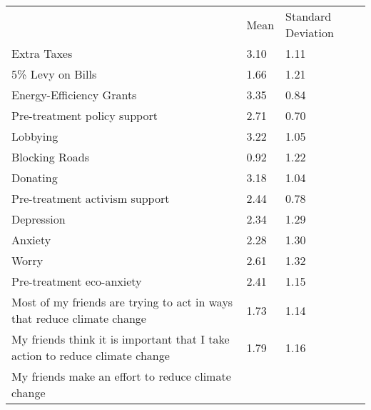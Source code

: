 \documentclass{article}
\begin{document}
\begin{table}[!h]
\centering
\begin{tabular}{lll}
\cline{1-3}
\multicolumn{1}{|l}{} &
  \multicolumn{1}{|l}{Mean} &
  \multicolumn{1}{|l|}{Standard Deviation} \\
\cline{1-3}
\multicolumn{1}{|l}{Extra Taxes} &
  \multicolumn{1}{|l}{3.10} &
  \multicolumn{1}{|l|}{1.11} \\
\cline{1-3}
\multicolumn{1}{|l}{5\% Levy on Bills} &
  \multicolumn{1}{|l}{1.66} &
  \multicolumn{1}{|l|}{1.21} \\
\cline{1-3}
\multicolumn{1}{|l}{Energy-Efficiency Grants} &
  \multicolumn{1}{|l}{3.35} &
  \multicolumn{1}{|l|}{0.84} \\
\cline{1-3}
\multicolumn{1}{|l}{Pre-treatment policy support} &
  \multicolumn{1}{|l}{2.71} &
  \multicolumn{1}{|l|}{0.70} \\
\cline{1-3}
\multicolumn{1}{|l}{Lobbying} &
  \multicolumn{1}{|l}{3.22} &
  \multicolumn{1}{|l|}{1.05} \\
\cline{1-3}
\multicolumn{1}{|l}{Blocking Roads} &
  \multicolumn{1}{|l}{0.92} &
  \multicolumn{1}{|l|}{1.22} \\
\cline{1-3}
\multicolumn{1}{|l}{Donating} &
  \multicolumn{1}{|l}{3.18} &
  \multicolumn{1}{|l|}{1.04} \\
\cline{1-3}
\multicolumn{1}{|l}{Pre-treatment activism support} &
  \multicolumn{1}{|l}{2.44} &
  \multicolumn{1}{|l|}{0.78} \\
\cline{1-3}
\multicolumn{1}{|l}{Depression} &
  \multicolumn{1}{|l}{2.34} &
  \multicolumn{1}{|l|}{1.29} \\
\cline{1-3}
\multicolumn{1}{|l}{Anxiety} &
  \multicolumn{1}{|l}{2.28} &
  \multicolumn{1}{|l|}{1.30} \\
\cline{1-3}
\multicolumn{1}{|l}{Worry} &
  \multicolumn{1}{|l}{2.61} &
  \multicolumn{1}{|l|}{1.32} \\
\cline{1-3}
\multicolumn{1}{|l}{Pre-treatment eco-anxiety} &
  \multicolumn{1}{|l}{2.41} &
  \multicolumn{1}{|l|}{1.15} \\
\cline{1-3}
\multicolumn{1}{|l}{Most of my friends are trying to act in ways that reduce climate change} &
  \multicolumn{1}{|l}{1.73} &
  \multicolumn{1}{|l|}{1.14} \\
\cline{1-3}
\multicolumn{1}{|l}{My friends think it is important that I take action to reduce climate change} &
  \multicolumn{1}{|l}{1.79} &
  \multicolumn{1}{|l|}{1.16} \\
\cline{1-3}
\multicolumn{1}{|l}{My friends make an effort to reduce climate change} &

\end{tabular}
\end{table}
\end{document}
